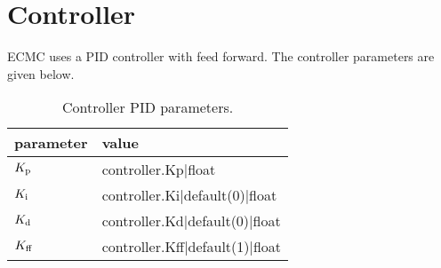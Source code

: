 \section{Controller}

ECMC uses a PID controller with feed forward.
The controller parameters are given below.

\begin{table}[H]
\centering
\caption{Controller PID parameters.}
\begin{tabularx}{\textwidth}{lX}
\hline
\rowcolor{Gray}
\textbf{parameter} & \textbf{value} \\
\hline
$K_\textnormal{p}$ & {{ controller.Kp|float }} \\
$K_\textnormal{i}$ & {{ controller.Ki|default(0)|float }} \\
$K_\textnormal{d}$ & {{ controller.Kd|default(0)|float }} \\
$K_\textnormal{ff}$ & {{ controller.Kff|default(1)|float }} \\
\hline
\end{tabularx}
\label{tab:controller_pid}
\end{table}
